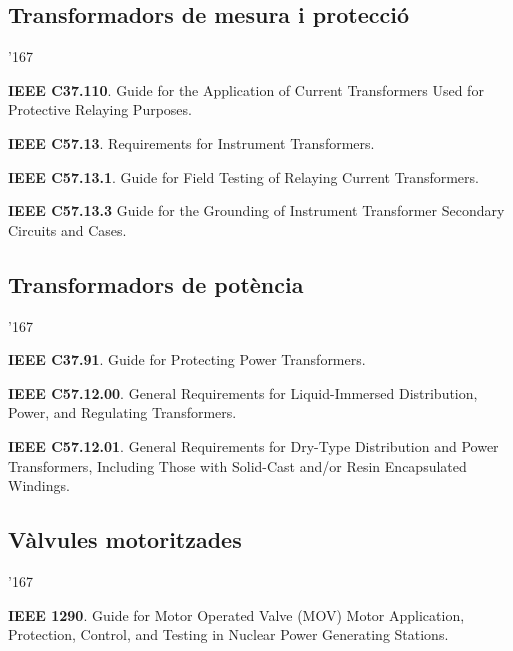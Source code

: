 \subsection*{Transformadors de mesura i protecci\'{o}}
\begin{dinglist}{'167}
    \item \textbf{IEEE C37.110}. Guide for the Application of Current Transformers Used for Protective Relaying Purposes.
    \item \textbf{IEEE C57.13}. Requirements for Instrument Transformers.
    \item \textbf{IEEE C57.13.1}. Guide for Field Testing of Relaying Current Transformers.
    \item \textbf{IEEE C57.13.3}  Guide for the Grounding of Instrument Transformer Secondary Circuits and Cases.
\end{dinglist}


\subsection*{Transformadors de pot\`{e}ncia}
\begin{dinglist}{'167}
    \item \textbf{IEEE C37.91}. Guide for Protecting Power Transformers.
    \item \textbf{IEEE C57.12.00}. General Requirements for Liquid-Immersed Distribution, Power, and Regulating Transformers.
    \item \textbf{IEEE C57.12.01}. General Requirements for Dry-Type Distribution and Power Transformers, Including Those with Solid-Cast and/or Resin Encapsulated Windings.
\end{dinglist}



\subsection*{V\`{a}lvules motoritzades}
\begin{dinglist}{'167}
    \item \textbf{IEEE 1290}. Guide for Motor Operated Valve (MOV) Motor Application, Protection, Control, and Testing in Nuclear Power Generating Stations.
\end{dinglist}

